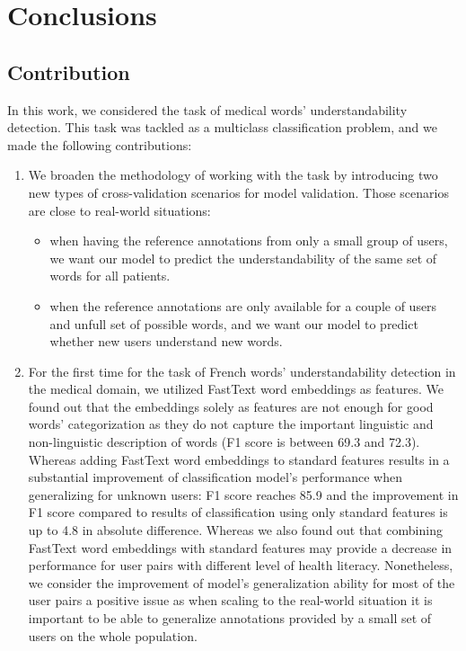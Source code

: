 \chapter{Conclusions}
\label{ch:conclusions}

\section{Contribution}
In this work, we considered the task of medical words' understandability detection. This task was tackled as a multiclass classification problem, and we made the following contributions:

\begin{enumerate}[listparindent=1.5em]
    \item We broaden the methodology of working with the task by introducing two new types of cross-validation scenarios for model validation. Those scenarios are close to real-world situations:
    \begin{itemize}
        \item when having the reference annotations from only a small group of users, we want our model to predict the understandability of the same set of words for all patients. 
        \item when the reference annotations are only available for a couple of users and unfull set of possible words, and we want our model to predict whether new users understand new words.
    \end{itemize}
    
    \item For the first time for the task of French words' understandability detection in the medical domain, we utilized FastText word embeddings as features. We found out that the embeddings solely as features are not enough for good words' categorization as they do not capture the important linguistic and non-linguistic description of words (F1 score is between 69.3 and 72.3). Whereas adding FastText word embeddings to standard features results in a substantial improvement of classification model's performance when generalizing for unknown users: F1 score reaches 85.9 and the improvement in F1 score compared to results of classification using only standard features is up to 4.8 in absolute difference. Whereas we also found out that combining FastText word embeddings with standard features may provide a decrease in performance for user pairs with different level of health literacy. Nonetheless, we consider the improvement of model's generalization ability for most of the user pairs a positive issue as when scaling to the real-world situation it is important to be able to generalize annotations provided by a small set of users on the whole population.
    

\end{enumerate}
